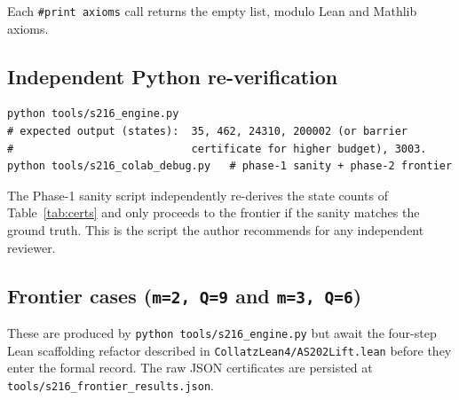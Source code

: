 \documentclass[11pt,a4paper]{article}
\theoremstyle{plain}
\theoremstyle{definition}
\begin{document}
Each \texttt{\#print axioms} call returns the empty list, modulo
Lean and Mathlib axioms.

\subsection*{Independent Python re-verification}

\begin{lstlisting}
python tools/s216_engine.py
# expected output (states):  35, 462, 24310, 200002 (or barrier
#                            certificate for higher budget), 3003.
python tools/s216_colab_debug.py   # phase-1 sanity + phase-2 frontier
\end{lstlisting}

The Phase-1 sanity script independently re-derives the state counts of
Table~\ref{tab:certs} and only proceeds to the frontier if the
sanity matches the ground truth. This is the script the author
recommends for any independent reviewer.

\subsection*{Frontier cases (\texttt{m=2, Q=9} and \texttt{m=3, Q=6})}

These are produced by \texttt{python tools/s216\_engine.py} but await
the four-step Lean scaffolding refactor described in
\texttt{CollatzLean4/AS202Lift.lean} before they enter the formal
record. The raw JSON certificates are persisted at
\texttt{tools/s216\_frontier\_results.json}.
\end{document}
